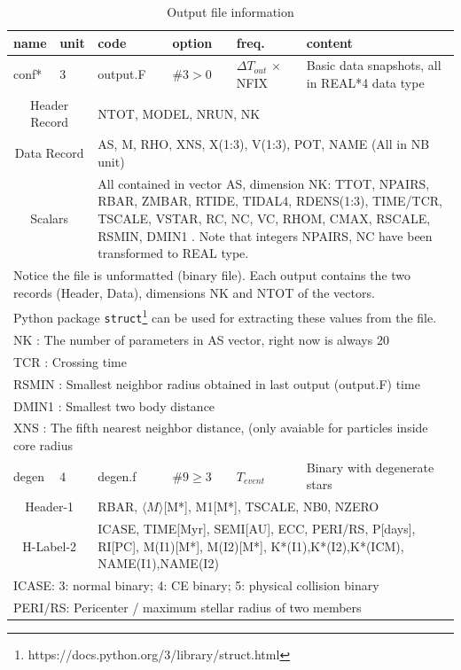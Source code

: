 \begin{longtable}{||p{0.42in}|p{0.25in}|p{0.6in}|p{0.6in}|p{0.4in}|p{2.3in}||}
  \caption{Output file information}
  \label{tb:main}
  \\\hline
    name   & unit & code & option  & freq.   & content \\\hline\hline
    conf*  & 3    & output.F   & $\#3>0$ & $\Delta T_{out}$ $\times$ NFIX  &  Basic data snapshots, all in REAL*4 data type \\\hline
\multicolumn{2}{|c|}{ Header Record } & \multicolumn{4}{|p{4.4in}|}{ NTOT, MODEL, NRUN, NK  }\\\hline
\multicolumn{2}{|c|}{ Data Record } & \multicolumn{4}{|p{4.4in}|}{ AS, M, RHO, XNS, X(1:3), V(1:3), POT, NAME (All in NB unit)}\\\hline
\multicolumn{2}{|c|}{ Scalars } & \multicolumn{4}{|p{4.4in}|}{ All contained in vector AS, dimension NK: TTOT, NPAIRS, RBAR, ZMBAR, RTIDE, TIDAL4, RDENS(1:3), TIME/TCR, TSCALE, VSTAR, RC, NC, VC, RHOM, CMAX, RSCALE, RSMIN, DMIN1 . Note that integers NPAIRS, NC have been transformed to REAL type.}\\\hline
\multicolumn{6}{|p{5.4in}|}{ Notice the file is unformatted (binary file). Each output contains the two records (Header, Data), dimensions NK and NTOT of the vectors. }\\
\multicolumn{6}{|p{5.4in}|}{ Python package \texttt{struct}\footnote{https://docs.python.org/3/library/struct.html} can be used for extracting these values from the file.}\\
\multicolumn{6}{|p{5.4in}|}{    NK :  The number of parameters in AS vector, right now is always 20} \\
\multicolumn{6}{|p{5.4in}|}{    TCR :  Crossing time} \\
\multicolumn{6}{|p{5.4in}|}{    RSMIN : Smallest neighbor radius obtained in last output (output.F) time }\\
\multicolumn{6}{|p{5.4in}|}{    DMIN1 :  Smallest two body distance } \\
\multicolumn{6}{|p{5.4in}|}{    XNS :  The fifth nearest neighbor distance, (only avaiable for particles inside core radius }\\\hline\hline

    degen  & 4    & degen.f    & $\#9\geq3$  & $T_{event}$  & Binary with degenerate stars \\\hline
\multicolumn{2}{|c|}{ Header-1 } & \multicolumn{4}{|p{4.4in}|}{ RBAR, $\langle M\rangle$[M*], M1[M*], TSCALE, NB0, NZERO }\\\hline
\multicolumn{2}{|c|}{ H-Label-2} & \multicolumn{4}{|p{4.4in}|}{ ICASE, TIME[Myr], SEMI[AU], ECC, PERI/RS, P[days], RI[PC], M(I1)[M*], M(I2)[M*], K*(I1),K*(I2),K*(ICM), NAME(I1),NAME(I2) } \\\hline
\multicolumn{6}{|p{5.4in}|}{ ICASE: 3: normal binary; 4: CE binary; 5: physical collision binary }\\
\multicolumn{6}{|p{5.4in}|}{ PERI/RS: Pericenter / maximum stellar radius of two members }\\\hline\hline


\end{longtable}
